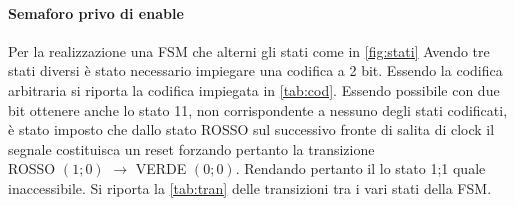 \documentclass[a4paper,11pt]{article}
\begin{document}
\paragraph{Semaforo privo di enable}
Per la realizzazione una FSM che alterni gli stati come in \figurename{\ref{fig:stati}}
Avendo tre stati diversi è stato necessario impiegare una codifica a 2 bit.
Essendo la codifica arbitraria si riporta la codifica impiegata in 
\tablename{\ref{tab:cod}}.
Essendo possibile con due bit ottenere anche lo stato 11,  non corrispondente a nessuno degli stati codificati,
è stato imposto che dallo stato ROSSO sul successivo fronte di salita di clock il segnale costituisca
un reset forzando pertanto la transizione \\ROSSO $(1;0)$  $\longrightarrow$ VERDE $(0;0)$.
Rendando pertanto il lo stato 1;1 quale inaccessibile.
Si riporta la \tablename{ \ref{tab:tran}} delle transizioni tra i vari stati della FSM.
\end{document}
